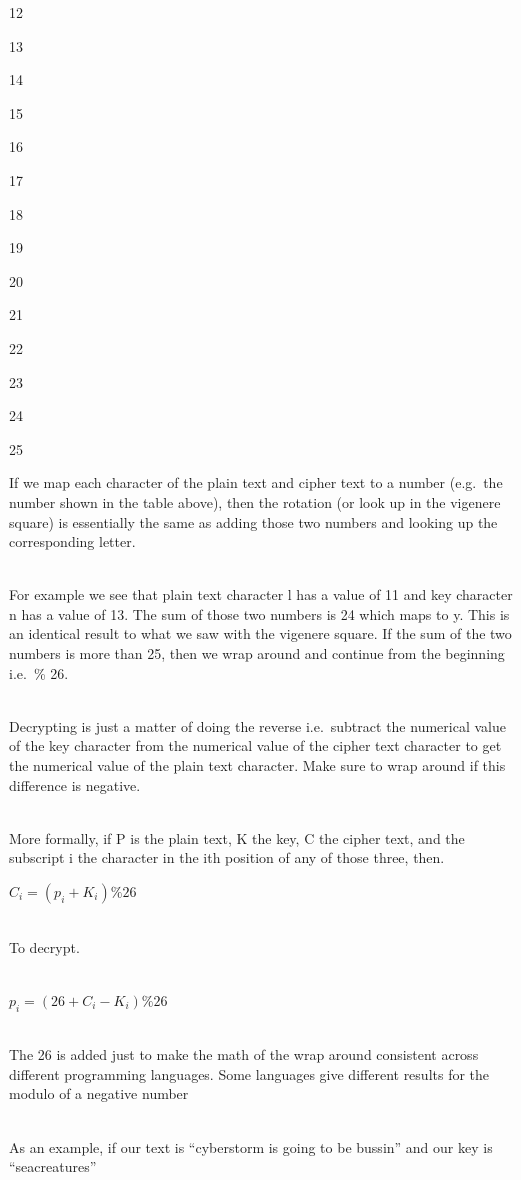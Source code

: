 \documentclass[
  letterpaper,
  DIV=11,
  numbers=noendperiod]{scrartcl}
\begin{document}
12

13

14

15

16

17

18

19

20

21

22

23

24

25

If we map each character of the plain text and cipher text to a number
(e.g.~the number shown in the table above), then the rotation (or look
up in the vigenere square) is essentially the same as adding those two
numbers and looking up the corresponding letter.\\
\strut \\
For example we see that plain text character l has a value of 11 and key
character n has a value of 13. The sum of those two numbers is 24 which
maps to y. This is an identical result to what we saw with the vigenere
square. If the sum of the two numbers is more than 25, then we wrap
around and continue from the beginning i.e.~\% 26.\\
\strut \\
Decrypting is just a matter of doing the reverse i.e.~subtract the
numerical value of the key character from the numerical value of the
cipher text character to get the numerical value of the plain text
character. Make sure to wrap around if this difference is negative.\\
\strut \\
More formally, if P is the plain text, K the key, C the cipher text, and
the subscript i the character in the ith position of any of those three,
then.

\(C_i=(p_i+K_i)\%26\)\\
\strut \\
To decrypt.\\
\strut \\
\(p_i=(26+C_i-K_i)\%26\)\\
\strut \\
The 26 is added just to make the math of the wrap around consistent
across different programming languages. Some languages give different
results for the modulo of a negative number\\
\strut \\
As an example, if our text is ``cyberstorm is going to be bussin'' and
our key is ``seacreatures''\\
\end{document}
